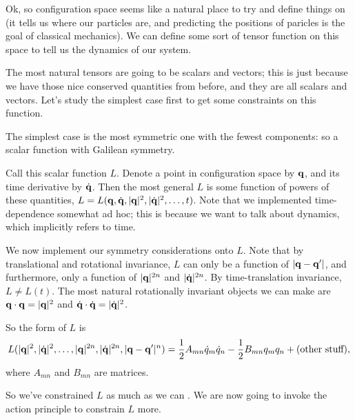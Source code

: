 \documentclass[11pt]{article}
\begin{document}
Ok, so configuration space seems like a natural place to try and
define things on (it tells us where our particles are, and predicting
the positions of paricles is the goal of classical mechanics). We can
define some sort of tensor function on this space to tell us the dynamics
of our system. 

The most natural tensors are going to be scalars and vectors;
this is just because we have those nice conserved quantities
from before, and they are all scalars and vectors. Let's study
the simplest case first to get some constraints on this function.

\begin{reemark}
    The simplest case is the most symmetric one with the fewest
    components: so a scalar function with Galilean symmetry.
\end{reemark}

\begin{iidea}
    Call this scalar function $L$. Denote a point in configuration space
    by $\mathbf{q}$, and its time derivative by $\dot{\mathbf{q}}$. Then the most
    general $L$ is some function of powers of these quantities, $L = L(\mathbf{q}, \dot{\mathbf{q}}, |\mathbf{q}|^2, |\dot{\mathbf{q}}|^2, \ldots, t)$.
    Note that we implemented time-dependence somewhat ad hoc; this is because
    we want to talk about dynamics, which implicitly refers to time.
 
    We now implement our symmetry considerations onto $L$.
    Note that by translational and rotational invariance, $L$ can only
    be a function of $|\mathbf{q} - \mathbf{q}'|$, and furthermore,
    only a function of $|\mathbf{q}|^{2n}$ and $|\dot{\mathbf{q}}|^{2n}$. By time-translation
    invariance, $L \neq L(t)$. The most natural rotationally invariant
    objects we can make are $\mathbf{q} \cdot \mathbf{q} = |\mathbf{q}|^2$ and $\dot{\mathbf{q}} \cdot \dot{\mathbf{q}} = |\dot{\mathbf{q}}|^2$.

    So the form of $L$ is
    \begin{align*}
        L(|\mathbf{q}|^2, |\dot{\mathbf{q}}|^2, \ldots, |\mathbf{q}|^{2n}, |\dot{\mathbf{q}}|^{2n}, |\mathbf{q} - \mathbf{q}'|^n) 
        = \frac{1}{2} A_{mn} \dot{q}_m \dot{q}_n - \frac{1}{2} B_{mn} q_m q_n + (\text{other stuff}),
    \end{align*}
    where $A_{mn}$ and $B_{mn}$ are matrices.
\end{iidea}

So we've constrained $L$ as much as we can .
We are now going to invoke the action principle to constrain $L$
more.
\end{document}
